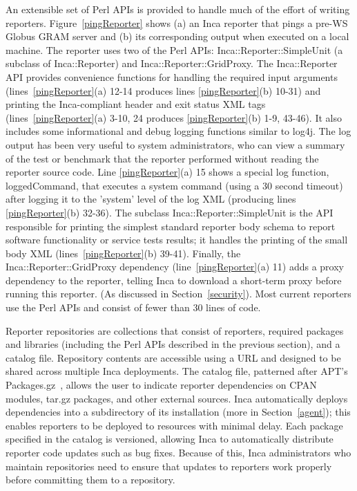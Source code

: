 \documentclass[times,10pt,twocolumn]{article}
\begin{document}
An extensible set of Perl APIs is provided to handle much of the effort of
writing reporters.  Figure~\ref{pingReporter} shows (a) an Inca reporter that
pings a pre-WS Globus GRAM server and (b) its corresponding output when
executed on a local machine.  The reporter uses two of the Perl APIs:
Inca::Reporter::SimpleUnit (a subclass of Inca::Reporter) and
Inca::Reporter::GridProxy.  The Inca::Reporter API provides convenience
functions for handling the required input arguments
(lines~\ref{pingReporter}(a) 12-14 produces lines \ref{pingReporter}(b)
10-31) and printing the Inca-compliant header and exit status XML tags
(lines~\ref{pingReporter}(a) 3-10, 24 produces \ref{pingReporter}(b)
1-9, 43-46).  It also includes some informational and debug logging functions
similar to log4j.  The log output has been very useful to system
administrators, who can view a summary of the test or benchmark that the
reporter performed without reading the reporter source code.  Line
\ref{pingReporter}(a) 15 shows a special log function, loggedCommand, that
executes a system command (using a 30 second timeout) after logging it to the
'system' level of the log XML (producing lines \ref{pingReporter}(b) 32-36).  The subclass
Inca::Reporter::SimpleUnit is the API responsible for printing the simplest
standard reporter body schema to report software functionality or service
tests results; it handles the printing of the small body XML
(lines~\ref{pingReporter}(b) 39-41).  Finally, the
Inca::Reporter::GridProxy dependency (line~\ref{pingReporter}(a) 11) adds a proxy
dependency to the reporter, telling Inca to download a
short-term proxy before running this reporter. (As discussed in
Section~\ref{security}).  Most current reporters use the Perl APIs and consist
of fewer than 30 lines of code.


Reporter repositories are collections that consist of reporters, required
packages and libraries (including the Perl APIs described in the previous
section), and a catalog file.  Repository contents are accessible using a URL
and designed to be shared across multiple Inca deployments.  The catalog file,
patterned after APT's Packages.gz~\cite{apt}, allows the user to indicate
reporter dependencies on CPAN modules, tar.gz packages, and other external
sources.  Inca automatically deploys dependencies into a
subdirectory of its installation (more in Section~\ref{agent}); this enables
reporters to be deployed to resources with minimal delay.  Each package
specified in the catalog is versioned, allowing Inca to
automatically distribute reporter code updates such as bug fixes.  Because of
this, Inca administrators who maintain repositories need to ensure
that updates to reporters work properly before committing them to a repository.
\end{document}
